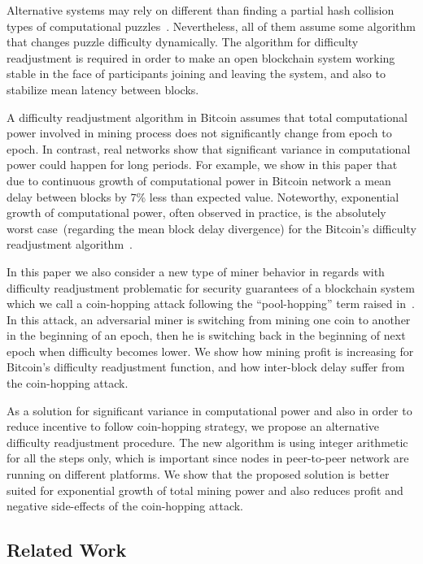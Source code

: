 \documentclass[]{llncs}
\begin{document}
Alternative systems may rely on different than finding a partial hash collision types of computational puzzles~\cite{miller2014permacoin,biryukov2017equihash}. Nevertheless, all of them assume some algorithm that changes puzzle difficulty dynamically. The algorithm for difficulty readjustment is required in order to make an open blockchain system working stable in the face of participants joining and leaving the system, and also to stabilize mean latency between blocks. 

A difficulty readjustment algorithm in Bitcoin assumes that total computational power involved in mining process does not significantly change from epoch to epoch. In contrast, real networks show that significant variance in computational power could happen for long periods.
For example, we show in this paper that due to continuous growth of computational power in Bitcoin network a mean delay between blocks by 7\% less than expected value.
Noteworthy, exponential growth of computational power, often observed in practice, is the absolutely worst case~(regarding the mean block delay divergence) for the Bitcoin’s difficulty readjustment algorithm~\cite{kraft2015difficulty}.
 
In this paper we also consider a new type of miner behavior in regards with difficulty readjustment problematic for security guarantees of a blockchain system which we call a coin-hopping attack following the ``pool-hopping'' term raised in~\cite{rosenfeld2011analysis}. In this attack, an adversarial miner is switching from mining one coin to another in the beginning of an epoch, then he is switching back in the beginning of next epoch when difficulty becomes lower. We show how mining profit is increasing for Bitcoin's difficulty readjustment function, and how inter-block delay suffer from the coin-hopping attack.

As a solution for significant variance in computational power and also in order to reduce incentive to follow coin-hopping strategy, we propose an alternative difficulty readjustment procedure. The new algorithm is using integer arithmetic for all the steps only, which is important since nodes in peer-to-peer network are running on different platforms. We show that the proposed solution is better suited for exponential growth of total mining power and also reduces profit and negative side-effects of the coin-hopping attack.

\subsection{Related Work}
\end{document}
